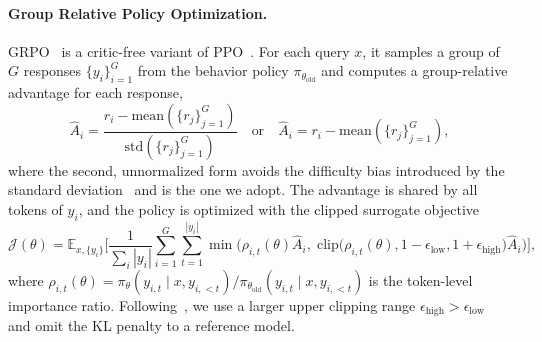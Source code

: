 \documentclass{article}
\begin{document}
\paragraph{Group Relative Policy Optimization.} GRPO~\citep{deepseek-r1} is a critic-free variant of PPO~\citep{ppo}. For each query $x$, it samples a group of $G$ responses $\{y_i\}_{i=1}^G$ from the behavior policy $\pi_{\theta_\text{old}}$ and computes a group-relative advantage for each response,
\begin{equation}
    \hat{A}_i = \frac{r_i - \mathrm{mean}(\{r_j\}_{j=1}^G)}{\mathrm{std}(\{r_j\}_{j=1}^G)} \quad\text{or}\quad \hat{A}_i = r_i - \mathrm{mean}(\{r_j\}_{j=1}^G),
    \label{eq:adv}
\end{equation}
where the second, unnormalized form avoids the difficulty bias introduced by the standard deviation~\citep{drgrpo} and is the one we adopt. The advantage is shared by all tokens of $y_i$, and the policy is optimized with the clipped surrogate objective
\begin{equation}
    \mathcal{J}(\theta) = \mathbb{E}_{x,\{y_i\}}\Bigg[\frac{1}{\sum_i |y_i|}\sum_{i=1}^{G}\sum_{t=1}^{|y_i|} \min\Big(\rho_{i,t}(\theta)\hat{A}_i,\; \mathrm{clip}\big(\rho_{i,t}(\theta), 1-\epsilon_\text{low}, 1+\epsilon_\text{high}\big)\hat{A}_i\Big)\Bigg],
    \label{eq:grpo}
\end{equation}
where $\rho_{i,t}(\theta)=\pi_\theta(y_{i,t}\mid x,y_{i,<t})/\pi_{\theta_\text{old}}(y_{i,t}\mid x,y_{i,<t})$ is the token-level importance ratio. Following~\citet{dapo}, we use a larger upper clipping range $\epsilon_\text{high}>\epsilon_\text{low}$ and omit the KL penalty to a reference model.
\end{document}
